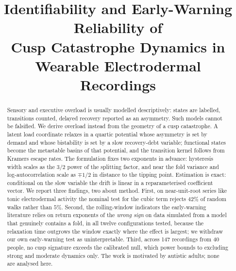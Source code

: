 \documentclass[conference]{IEEEtran}
\begin{document}
\title{Identifiability and Early-Warning Reliability of\\
Cusp Catastrophe Dynamics in\\
Wearable Electrodermal Recordings}

\author{
\and
{}
\and
{}
}

\maketitle

\begin{abstract}
Sensory and executive overload is usually modelled descriptively: states are
labelled, transitions counted, delayed recovery reported as an asymmetry. Such
models cannot be falsified. We derive overload instead from the geometry of a
cusp catastrophe. A latent load coordinate relaxes in a quartic potential whose
asymmetry is set by demand and whose bistability is set by a slow recovery-debt
variable; functional states become the metastable basins of that potential, and
the transition kernel follows from Kramers escape rates. The formulation fixes
two exponents in advance: hysteresis width
scales as the $3/2$ power of the splitting factor, and near the fold variance
and log-autocorrelation scale as $\mp1/2$ in distance to the tipping point.
Estimation is exact: conditional on the slow variable the drift is linear in a
reparameterised coefficient vector. We report three findings, two about
method. First, on near-unit-root series like tonic electrodermal activity the
nominal test for the cubic term rejects $42\%$ of random walks rather than
$5\%$. Second, the rolling-window indicators the early-warning literature
relies on return exponents of the \emph{wrong sign} on data simulated from a
model that genuinely contains a fold, in all twelve configurations tested,
because the relaxation time outgrows the window exactly where the effect is
largest; we withdraw our own early-warning test as uninterpretable. Third,
across 147 recordings from 40 people, no cusp signature exceeds the calibrated
null, which power bounds to excluding strong and moderate dynamics only. The
work is motivated by autistic adults; none are analysed here.
\end{abstract}
\end{document}
